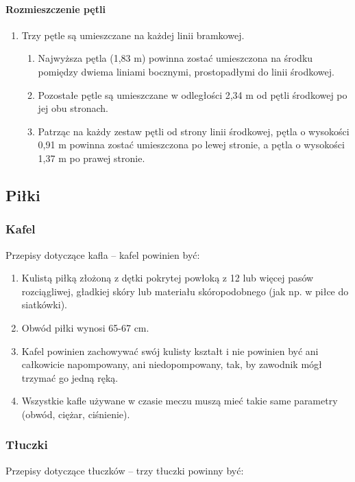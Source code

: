 \documentclass[12pt]{article}
\begin{document}
\paragraph{Rozmieszczenie pętli}
\begin{enumerate}
\item Trzy pętle są umieszczane na każdej linii bramkowej.
  \begin{enumerate}
  \item Najwyższa pętla (1,83 m) powinna zostać umieszczona na środku
pomiędzy dwiema liniami bocznymi, prostopadłymi do linii środkowej.

  \item Pozostałe pętle są umieszczane w odległości 2,34 m od pętli
środkowej po jej obu stronach.

  \item Patrząc na każdy zestaw pętli od strony linii środkowej, pętla o
wysokości 0,91 m powinna zostać umieszczona po lewej stronie, a pętla o
wysokości 1,37 m po prawej stronie.
  \end{enumerate}
\end{enumerate}

\subsection{Piłki}

\subsubsection{Kafel}
Przepisy dotyczące kafla -- kafel powinien być:

\begin{enumerate}
\item Kulistą piłką złożoną z dętki pokrytej powłoką z 12 lub więcej pasów
rozciągliwej, gładkiej skóry lub materiału skóropodobnego (jak np. w
piłce do siatkówki).

\item Obwód piłki wynosi 65-67 cm.

\item Kafel powinien zachowywać swój kulisty kształt i nie powinien być ani
całkowicie napompowany, ani niedopompowany, tak, by zawodnik mógł
trzymać go jedną ręką.

\item Wszystkie kafle używane w czasie meczu muszą mieć takie same
parametry (obwód, ciężar, ciśnienie).
\end{enumerate}

\subsubsection{Tłuczki}
Przepisy dotyczące tłuczków -- trzy tłuczki powinny być:
\end{document}
